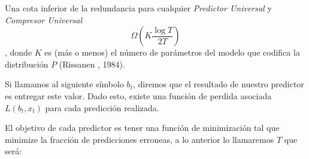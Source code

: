 Una cota inferior de la redundancia para cualquier \emph{Predictor Universal} y \emph{Compresor Universal} \begin{equation}
\Omega( K \dfrac{\log T}{2 T } )
\end{equation}, donde $K$ es (más o menos) el número de parámetros del modelo que codifica la distribución $P$ (Rissanen \cite{Rissanen1984}, 1984).






 

Si llamamos al siguiente símbolo $b_{t}$, diremos que el resultado de nuestro predictor es entregar este valor. Dado esto, existe una función de perdida asociada $L( b_{t},x_{t} )$ para cada predicción realizada. 

El objetivo de cada predictor es tener una función de minimización tal que minimize la fracción de predicciones erroneas, a lo anterior lo llamaremos $T$ que será:










